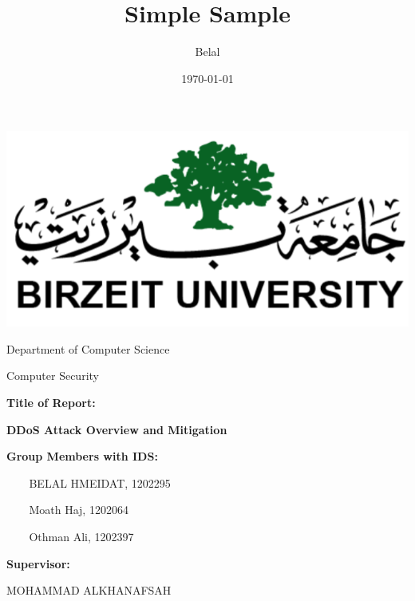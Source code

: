 \documentclass[a4paper, 12pt]{report} %
\title{Simple Sample} %
\author{Belal} %
\date{\today} %
\begin{document}
 
\setlength{\cftbeforetoctitleskip}{0pt plus 1pt} %
\setlength{\cftbeforeloftitleskip}{0pt plus 1pt} %
\setlength{\cftbeforelottitleskip}{0pt plus 1pt} %
    \begin{titlepage}
        \begin{center}
            \includegraphics{Birzeit_Logo.png}

            Department of Computer Science 
            \vspace{0.8cm}

            Computer Security
            \vspace{0.8cm}
            
            \end{center}
            
            \textbf{\large{Title of Report:}}
            \vspace{0.4cm}
            
            \begin{center}
                \textbf{\Large{DDoS Attack Overview and Mitigation}}
            \end{center} 
            \vspace{0.8cm}
            
            \textbf{\large{Group Members with IDS:}}
            
            \hrulefill
            \begin{itemize}
                \item[$ $] BELAL HMEIDAT, 1202295 %
                \item[$ $] Moath Haj, 1202064
                \item[$ $] Othman Ali, 1202397
            \end{itemize}
            

            \vspace{0.8cm}

            \textbf{\large{Supervisor:}}
            \vspace{0.4cm}
            
            \hspace{\parindent}MOHAMMAD ALKHANAFSAH %
            \pagebreak

    \end{titlepage}
\end{document}
